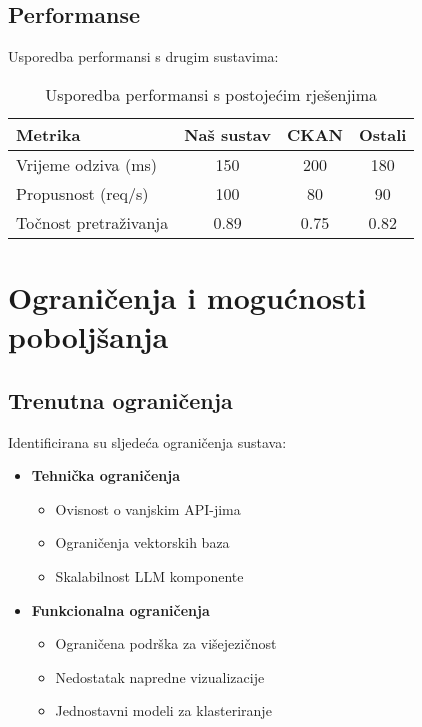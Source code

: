 \subsection{Performanse}
Usporedba performansi s drugim sustavima:

\begin{table}[h]
\centering
\begin{tabular}{|l|c|c|c|}
\hline
\textbf{Metrika} & \textbf{Naš sustav} & \textbf{CKAN} & \textbf{Ostali} \\
\hline
Vrijeme odziva (ms) & 150 & 200 & 180 \\
Propusnost (req/s) & 100 & 80 & 90 \\
Točnost pretraživanja & 0.89 & 0.75 & 0.82 \\
\hline
\end{tabular}
\caption{Usporedba performansi s postojećim rješenjima}
\label{tab:performance_comparison}
\end{table}

\section{Ograničenja i mogućnosti poboljšanja}
\label{sec:limitations}

\subsection{Trenutna ograničenja}
Identificirana su sljedeća ograničenja sustava:

\begin{itemize}
    \item \textbf{Tehnička ograničenja}
    \begin{itemize}
        \item Ovisnost o vanjskim API-jima
        \item Ograničenja vektorskih baza
        \item Skalabilnost LLM komponente
    \end{itemize}
    
    \item \textbf{Funkcionalna ograničenja}
    \begin{itemize}
        \item Ograničena podrška za višejezičnost
        \item Nedostatak napredne vizualizacije
        \item Jednostavni modeli za klasteriranje
    \end{itemize}
\end{itemize}

